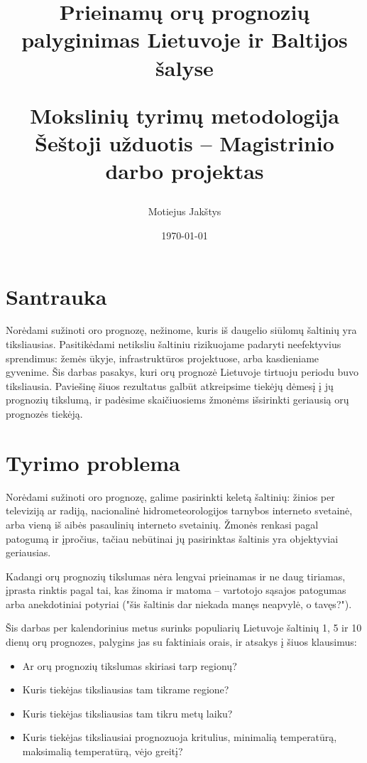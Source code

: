 \documentclass{article}
\title{
    Prieinamų orų prognozių palyginimas Lietuvoje ir Baltijos šalyse \\ \vspace{4mm}

    \large Mokslinių tyrimų metodologija\\
    Šeštoji užduotis -- Magistrinio darbo projektas
}
\author{Motiejus Jakštys}
\date{\today}
\begin{document}
\maketitle

\newpage

\section{Santrauka}

Norėdami sužinoti oro prognozę, nežinome, kuris iš daugelio siūlomų šaltinių
yra tiksliausias. Pasitikėdami netiksliu šaltiniu rizikuojame padaryti
neefektyvius sprendimus: žemės ūkyje, infrastruktūros projektuose, arba
kasdieniame gyvenime. Šis darbas pasakys, kuri orų prognozė Lietuvoje tirtuoju
periodu buvo tiksliausia. Paviešinę šiuos rezultatus galbūt atkreipsime tiekėjų
dėmesį į jų prognozių tikslumą, ir padėsime skaičiuosiems žmonėms išsirinkti
geriausią orų prognozės tiekėją.

\section{Tyrimo problema}

Norėdami sužinoti oro prognozę, galime pasirinkti keletą šaltinių: žinios per
televiziją ar radiją, nacionalinė hidrometeorologijos tarnybos interneto
svetainė, arba vieną iš aibės pasaulinių interneto svetainių. Žmonės renkasi
pagal patogumą ir įpročius, tačiau nebūtinai jų pasirinktas šaltinis yra
objektyviai geriausias.

Kadangi orų prognozių tikslumas nėra lengvai prieinamas ir ne daug tiriamas,
įprasta rinktis pagal tai, kas žinoma ir matoma -- vartotojo sąsajos patogumas
arba anekdotiniai potyriai ("šis šaltinis dar niekada manęs neapvylė, o
tavęs?").

Šis darbas per kalendorinius metus surinks populiarių Lietuvoje šaltinių 1, 5
ir 10 dienų orų prognozes, palygins jas su faktiniais orais, ir atsakys į šiuos
klausimus:

\begin{itemize}
    \item Ar orų prognozių tikslumas skiriasi tarp regionų?
    \item Kuris tiekėjas tiksliausias tam tikrame regione?
    \item Kuris tiekėjas tiksliausias tam tikru metų laiku?
    \item Kuris tiekėjas tiksliausiai prognozuoja kritulius, minimalią
        temperatūrą, maksimalią temperatūrą, vėjo greitį?
\end{itemize}
\end{document}
